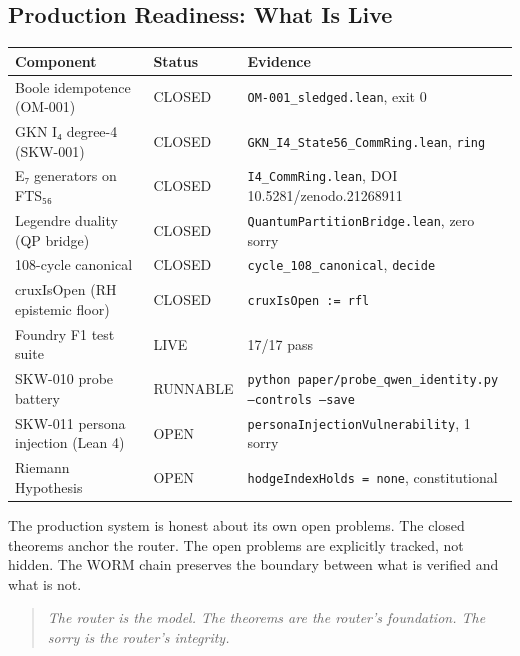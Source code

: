 \subsection{Production Readiness: What Is Live}

\begin{center}
\begin{tabular}{p{5cm}p{2cm}p{5cm}}
\textbf{Component} & \textbf{Status} & \textbf{Evidence} \\
\hline
Boole idempotence (OM-001) & {\color{green}CLOSED} &
  \texttt{OM-001\_sledged.lean}, exit 0 \\
GKN I₄ degree-4 (SKW-001) & {\color{green}CLOSED} &
  \texttt{GKN\_I4\_State56\_CommRing.lean}, \texttt{ring} \\
E₇ generators on FTS₅₆ & {\color{green}CLOSED} &
  \texttt{I4\_CommRing.lean}, DOI 10.5281/zenodo.21268911 \\
Legendre duality (QP bridge) & {\color{green}CLOSED} &
  \texttt{QuantumPartitionBridge.lean}, zero sorry \\
108-cycle canonical & {\color{green}CLOSED} &
  \texttt{cycle\_108\_canonical}, \texttt{decide} \\
cruxIsOpen (RH epistemic floor) & {\color{green}CLOSED} &
  \texttt{cruxIsOpen := rfl} \\
Foundry F1 test suite & {\color{green}LIVE} & 17/17 pass \\
SKW-010 probe battery & {\color{orange}RUNNABLE} &
  \texttt{python paper/probe\_qwen\_identity.py --controls --save} \\
SKW-011 persona injection (Lean 4) & {\color{red}OPEN} &
  \texttt{personaInjectionVulnerability}, 1 sorry \\
Riemann Hypothesis & {\color{red}OPEN} &
  \texttt{hodgeIndexHolds = none}, constitutional \\
\end{tabular}
\end{center}

\medskip

The production system is honest about its own open problems. The closed
theorems anchor the router. The open problems are explicitly tracked, not
hidden. The WORM chain preserves the boundary between what is verified and
what is not.

\begin{quote}
\textit{The router is the model. The theorems are the router's foundation.
The sorry is the router's integrity.}
\end{quote}

